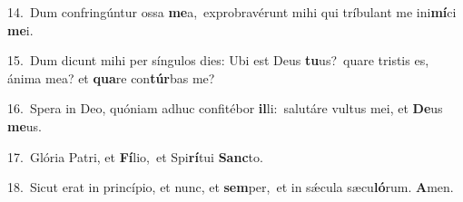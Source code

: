 {\numbfont\textcolor{\numbcolor}{14.}}~Dum confringúntur ossa \textbf{me}\-a,~\star exprobravérunt mihi qui tríbulant me ini\-\textbf{mí}\-ci \textbf{me}\-i.\par
{\numbfont\textcolor{\numbcolor}{15.}}~Dum dicunt mihi per síngulos dies: Ubi est Deus \textbf{tu}\-us?~\star quare tristis es, ánima mea? et \textbf{qua}\-re con\-\textbf{túr}\-bas me?\par
{\numbfont\textcolor{\numbcolor}{16.}}~Spera in Deo, quóniam adhuc confitébor \textbf{il}\-li:~\star salutáre vultus mei, et \textbf{De}\-us \textbf{me}\-us.\par
{\numbfont\textcolor{\numbcolor}{17.}}~Glória Patri, et \textbf{Fí}\-lio,~\star et Spi\-\textbf{rí}\-tui \textbf{Sanc}\-to.\par
{\numbfont\textcolor{\numbcolor}{18.}}~Sicut erat in princípio, et nunc, et \textbf{sem}\-per,~\star et in sǽcula sæcu\-\textbf{ló}\-rum. \textbf{A}\-men.\par
